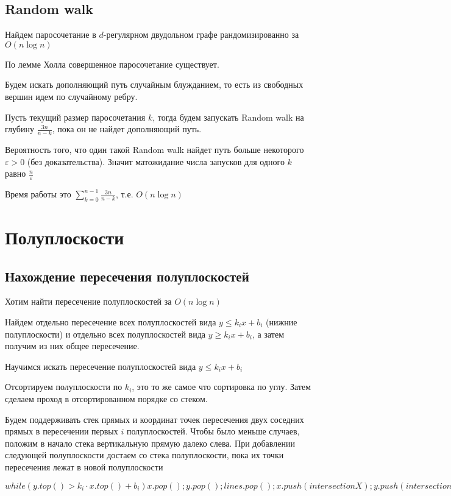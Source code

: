 ﻿


\section{Random walk}
Найдем паросочетание в $d$-регулярном двудольном графе рандомизированно за $O(n \log n)$

По лемме Холла совершенное паросочетание существует.

Будем искать дополняющий путь случайным блужданием, то есть из свободных вершин идем по случайному ребру.

Пусть текущий размер паросочетания $k$, тогда будем запускать Random walk на глубину $\frac{3n}{n-k}$, пока он не найдет дополняющий путь.

Вероятность того, что один такой Random walk найдет путь больше некоторого $\varepsilon>0$ (без доказательства). Значит матожидание числа запусков для одного $k$ равно $\frac{n}{\varepsilon}$

Время работы это $\sum\limits_{k=0}^{n-1}\frac{3n}{n-k}$, т.е. $O(n \log n)$

\chapter{Полуплоскости}

\section{Нахождение пересечения полуплоскостей}
Хотим найти пересечение полуплоскостей за $O(n \log n)$

Найдем отдельно пересечение всех полуплоскостей вида $y \le k_i x + b_i$ (нижние полуплоскости) и отдельно всех полуплоскостей вида $y \ge k_i x + b_i$, а затем получим из них общее пересечение.

Научимся искать пересечение полуплоскостей вида $y \le k_i x + b_i$

Отсортируем полуплоскости по $k_i$, это то же самое что сортировка по углу. Затем сделаем проход в отсортированном порядке со стеком.

Будем поддерживать стек прямых и координат точек пересечения двух соседних прямых в пересечении первых $i$ полуплоскостей. Чтобы было меньше случаев, положим в начало стека вертикальную прямую далеко слева. При добавлении следующей полуплоскости достаем со стека полуплоскости, пока их точки пересечения лежат в новой полуплоскости

\begin{cppcode}
$while (y.top() > k_i \cdot x.top() + b_i) {
	x.pop();
	y.pop();
	lines.pop();
}
x.push(intersectionX);
y.push(intersectionY);
lines.push(newLine);$
\end{cppcode}

